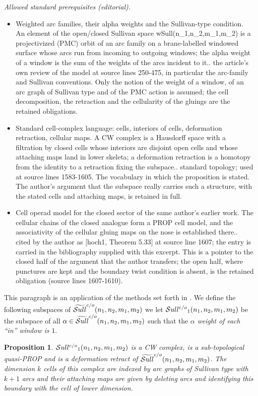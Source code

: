 \documentclass[10pt,a4paper]{amsart}
\newtheorem{prop}[thm]{Proposition}
\def\Sull{\rm {\mathcal S}ull^{\rm c/o}}
\def\wSull{\widetilde{\rm {\mathcal S}ull}^{\rm c/o}}
\begin{document}
\noindent\textit{Allowed standard prerequisites (editorial).}\begin{itemize}
\item Weighted arc families, their alpha weights and the Sullivan-type condition. An element of the open/closed Sullivan space wSull(n\_1,n\_2,m\_1,m\_2) is a projectivized (PMC) orbit of an arc family on a brane-labelled windowed surface whose arcs run from incoming to outgoing windows; the alpha weight of a window is the sum of the weights of the arcs incident to it.. the article's own review of the model at source lines 250-475, in particular the arc-family and Sullivan conventions. Only the notion of the weight of a window, of an arc graph of Sullivan type and of the PMC action is assumed; the cell decomposition, the retraction and the cellularity of the gluings are the retained obligations.
\item Standard cell-complex language: cells, interiors of cells, deformation retraction, cellular maps. A CW complex is a Hausdorff space with a filtration by closed cells whose interiors are disjoint open cells and whose attaching maps land in lower skeleta; a deformation retraction is a homotopy from the identity to a retraction fixing the subspace.. standard topology; used at source lines 1583-1605. The vocabulary in which the proposition is stated. The author's argument that the subspace really carries such a structure, with the stated cells and attaching maps, is retained in full.
\item Cell operad model for the closed sector of the same author's earlier work. The cellular chains of the closed analogue form a PROP cell model, and the associativity of the cellular gluing maps on the nose is established there.. cited by the author as [hoch1, Theorem 5.33] at source line 1607; the entry is carried in the bibliography supplied with this excerpt. This is a pointer to the closed half of the argument that the author transfers; the open half, where punctures are kept and the boundary twist condition is absent, is the retained obligation (source lines 1607-1610).
\end{itemize}\medskip
This paragraph is an application of the methods set forth in \cite{hoch1}.
We def\/ine the following subspaces of $\wSull(n_1,n_2,m_1,m_2)$  we let
${\Sull}_1(n_1,n_2,m_1,m_2)$ be the subspace of all $\alpha\in\wSull(n_1,n_2,m_1,m_2)$
such that the {\em $\alpha$ weight of each ``in'' window is $1$}.

\begin{prop}
${\Sull}_1(n_1,n_2,m_1,m_2)$ is a CW complex, is a sub-topological quasi-PROP and is a deformation retract of $\wSull(n_1,n_2,m_1,m_2)$.
The dimension $k$ cells of this complex are indexed by arc graphs of Sullivan type with $k+1$ arcs
and their attaching maps are given by deleting arcs and identifying this boundary with the cell of lower
dimension.
\end{prop}
\end{document}
